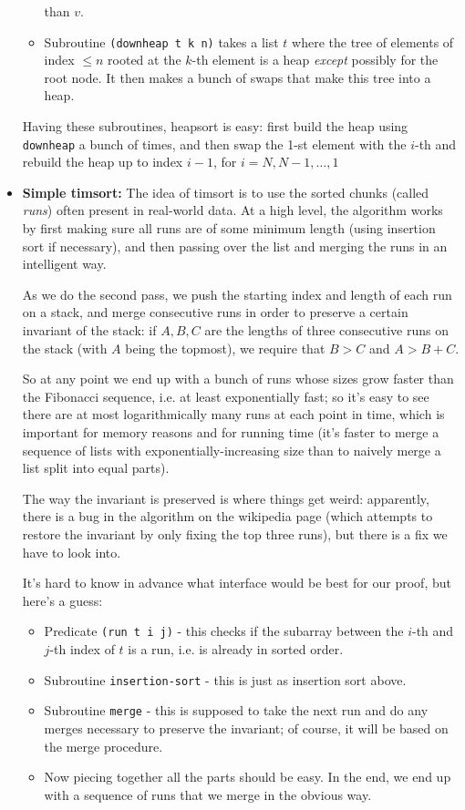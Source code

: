 \documentclass{article}
\begin{document}
\begin{itemize}
\begin{itemize}
than $v$.
  \item
Subroutine \verb|(downheap t k n)| takes a list $t$ where the tree of elements
of index $\leq n$ rooted at the $k$-th element is a heap \emph{except} possibly
for the root node. It then makes a bunch of swaps that make this tree into a
heap.
\end{itemize}
Having these subroutines, heapsort is easy: first build the heap using
\verb|downheap| a bunch of times, and then swap the 1-st element with the
$i$-th and rebuild the heap up to index $i-1$, for $i = N, N-1, \ldots, 1$
  \item
\textbf{Simple timsort:} The idea of timsort is to use the sorted chunks
(called \emph{runs}) often present in real-world data. At a high level, the
algorithm works by first making sure all runs are of some minimum length (using
insertion sort if necessary), and then passing over the list and merging the
runs in an intelligent way.

  As we do the second pass, we push the starting index and length of each run
on a stack, and merge consecutive runs in order to preserve a certain invariant
of the stack:  if $A,B,C$ are the lengths of three consecutive runs on the
stack (with $A$ being the topmost), we require that $B>C$ and $A>B+C$.

  So at any point we end up with a bunch of runs whose sizes grow faster than
the Fibonacci sequence, i.e. at least exponentially fast; so it's easy to see
there are at most logarithmically many runs at each point in time, which is
important for memory reasons and for running time (it's faster to merge a
sequence of lists with exponentially-increasing size than to naively merge a
list split into equal parts).

  The way the invariant is preserved is where things get weird: apparently,
there is a bug in the algorithm on the wikipedia page (which attempts to
restore the invariant by only fixing the top three runs), but there is a fix
\cite{deopenjdk} we have to look into.

  It's hard to know in advance what interface would be best for our proof, but
here's a guess:
\begin{itemize}
  \item Predicate \verb|(run t i j)| - this checks if the subarray between
the $i$-th and $j$-th index of $t$ is a run, i.e. is already in sorted order.
  \item Subroutine \verb|insertion-sort| - this is just as insertion sort above.
  \item Subroutine \verb|merge| - this is supposed to take the next run and do
any merges necessary to preserve the invariant; of course, it will be based on
the merge procedure.
  \item Now piecing together all the parts should be easy. In the end, we end
up with a sequence of runs that we merge in the obvious way.
\end{itemize}


\end{itemize}
\end{document}
